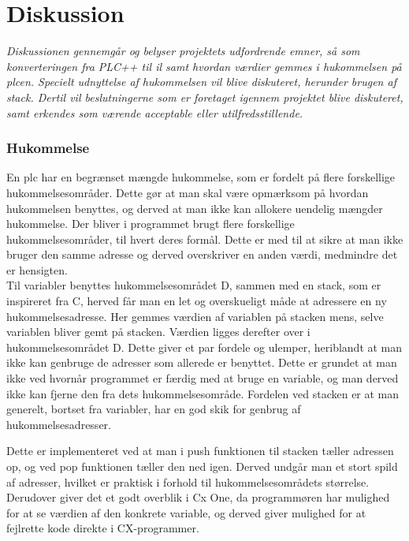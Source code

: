 \chapter{Diskussion}\label{sec:Diskussion}
\textit{Diskussionen gennemgår og belyser projektets udfordrende emner, så som konverteringen fra PLC++ til \gls{il} samt hvordan værdier gemmes i hukommelsen på \gls{plc}en.
Specielt udnyttelse af hukommelsen vil blive diskuteret, herunder brugen af stack. 
Dertil vil beslutningerne som er foretaget igennem projektet blive diskuteret, samt erkendes som værende acceptable eller utilfredsstillende.}

\subsection*{Hukommelse}
En \gls{plc} har en begrænset mængde hukommelse, som er fordelt på flere forskellige hukommelsesområder.
Dette gør at man skal være opmærksom på hvordan hukommelsen benyttes, og derved at man ikke kan allokere uendelig mængder hukommelse.
Der bliver i programmet brugt flere forskellige hukommelsesområder, til hvert deres formål. Dette er med til at sikre at man ikke bruger den samme adresse og derved overskriver en anden værdi, medmindre det er hensigten.\\

\noindent Til variabler benyttes hukommelsesområdet D, sammen med en stack, som er inspireret fra C, herved får man en let og overskueligt måde at adressere en ny hukommelsesadresse.
Her gemmes værdien af variablen på stacken mens, selve variablen bliver gemt på stacken.
Værdien ligges derefter over i hukommelsesområdet D.
Dette giver et par fordele og ulemper, heriblandt at man ikke kan genbruge de adresser som allerede er benyttet. Dette er grundet at man ikke ved hvornår programmet er færdig med at bruge en variable, og man derved ikke kan fjerne den fra dets hukommelsesområde.
Fordelen ved stacken er at man generelt, bortset fra variabler, har en god skik for genbrug af hukommelsesadresser.

Dette er implementeret ved at man i push funktionen til stacken tæller adressen op, og ved pop funktionen tæller den ned igen. Derved undgår man et stort spild af adresser, hvilket er praktisk i forhold til hukommelsesområdets størrelse.
Derudover giver det et godt overblik i Cx One, da programmøren har mulighed for at se værdien af den konkrete variable, og derved giver mulighed for at fejlrette kode direkte i CX-programmer.\\

